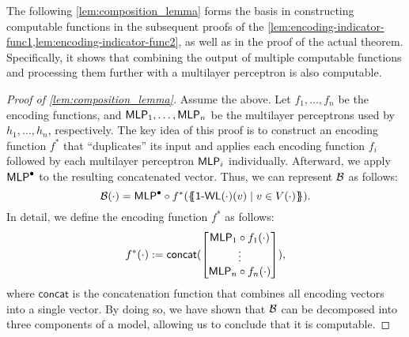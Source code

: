 The following \cref{lem:composition_lemma} forms the basis in constructing \wlnn computable functions in the subsequent proofs of the \cref{lem:encoding-indicator-func1,lem:encoding-indicator-func2}, as well as in the proof of the actual theorem. Specifically, it shows that combining the output of multiple \wlnn computable functions and processing them further with a multilayer perceptron is also \wlnn computable.
\begin{proof}[Proof of \cref{lem:composition_lemma}]
    Assume the above. Let $f_{1}, \ldots, f_{n}$ be the encoding functions, and $\textsf{MLP}_1, \ldots, \textsf{MLP}_n$ be the multilayer perceptrons used by $h_1, \dots, h_n$, respectively. The key idea of this proof is to construct an encoding function $f^*$ that ``duplicates'' its input and applies each encoding function $f_i$ followed by each multilayer perceptron $\textsf{MLP}_i$ individually. Afterward, we apply $\textsf{MLP}^\bullet$ to the resulting concatenated vector. Thus, we can represent $\mathcal{B}$ as follows:
    \begin{equation*}
        \mathcal{B}(\cdot) = \textsf{MLP}^\bullet \circ f^* (\{\!\!\{ \textsf{1-WL}(\cdot)(v) \mid v \in V(\cdot) \}\!\!\}).
    \end{equation*}
    In detail, we define the encoding function $f^*$ as follows:
    \begin{equation*}
        f^*(\cdot) := \textsf{concat}(
            \begin{bmatrix}
                \textsf{MLP}_1 \circ f_1(\cdot)\\
                \vdots\\
                \textsf{MLP}_n \circ f_n(\cdot)
            \end{bmatrix}),
    \end{equation*}
    where $\textsf{concat}$ is the concatenation function that combines all encoding vectors into a single vector. By doing so, we have shown that $\mathcal{B}$ can be decomposed into three components of a \wlnn model, allowing us to conclude that it is \wlnn computable.
\end{proof}

